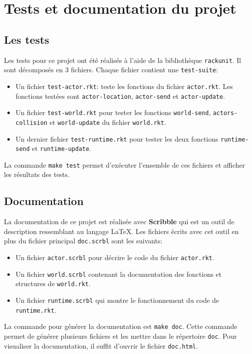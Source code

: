 \section{Tests et documentation du projet}
\subsection{Les tests}
Les tests pour ce projet ont été réalisés à l'aide de la bibliothèque \texttt{rackunit}. Il sont décomposés en 3 fichiers. Chaque fichier contient une \texttt{test-suite}:
\begin{itemize}
    \item Un fichier \texttt{test-actor.rkt}: teste les fonctions du fichier \texttt{actor.rkt}. Les fonctions testées sont \texttt{actor-location}, \texttt{actor-send} et \texttt{actor-update}.
    \item Un fichier \texttt{test-world.rkt} pour tester les fonctions \texttt{world-send}, \texttt{actors-collision} et \texttt{world-update} du fichier \texttt{world.rkt}.
    \item Un dernier fichier \texttt{test-runtime.rkt} pour tester les deux fonctions \texttt{runtime-send} et \texttt{runtime-update}.
\end{itemize}
La commande \texttt{make test} permet d'exécuter l'ensemble de ces fichiers et afficher les résultats des tests.
\subsection{Documentation}

La documentation de ce projet est réalisée avec \textbf{Scribble} qui est un outil de description ressemblant au langage \LaTeX. Les fichiers écrits avec cet outil  en plus du fichier principal \texttt{doc.scrbl} sont les suivants:
\begin{itemize}
    \item Un fichier \texttt{actor.scrbl} pour décrire le code du fichier \texttt{actor.rkt}.
    \item Un fichier \texttt{world.scrbl} contenant la documentation des fonctions et structures de \texttt{world.rkt}.
    \item Un fichier \texttt{runtime.scrbl} qui montre le fonctionnement du code de \texttt{runtime.rkt}.
\end{itemize}
La commande pour générer la documentation est \texttt{make doc}.
Cette commande permet de générer plusieurs fichiers et les mettre dans le répertoire \texttt{doc}. Pour visualiser la documentation, il suffit d'ouvrir le fichier \texttt{doc.html}.